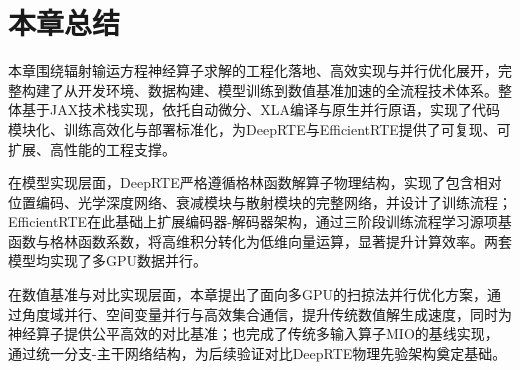 \section{本章总结}

本章围绕辐射输运方程神经算子求解的工程化落地、高效实现与并行优化展开，完整构建了从开发环境、数据构建、模型训练到数值基准加速的全流程技术体系。整体基于JAX技术栈实现，依托自动微分、XLA编译与原生并行原语，实现了代码模块化、训练高效化与部署标准化，为DeepRTE与EfficientRTE提供了可复现、可扩展、高性能的工程支撑。

在模型实现层面，DeepRTE严格遵循格林函数解算子物理结构，实现了包含相对位置编码、光学深度网络、衰减模块与散射模块的完整网络，并设计了训练流程；EfficientRTE在此基础上扩展编码器-解码器架构，通过三阶段训练流程学习源项基函数与格林函数系数，将高维积分转化为低维向量运算，显著提升计算效率。两套模型均实现了多GPU数据并行。

在数值基准与对比实现层面，本章提出了面向多GPU的扫掠法并行优化方案，通过角度域并行、空间变量并行与高效集合通信，提升传统数值解生成速度，同时为神经算子提供公平高效的对比基准；也完成了传统多输入算子MIO的基线实现，通过统一分支-主干网络结构，为后续验证对比DeepRTE物理先验架构奠定基础。
